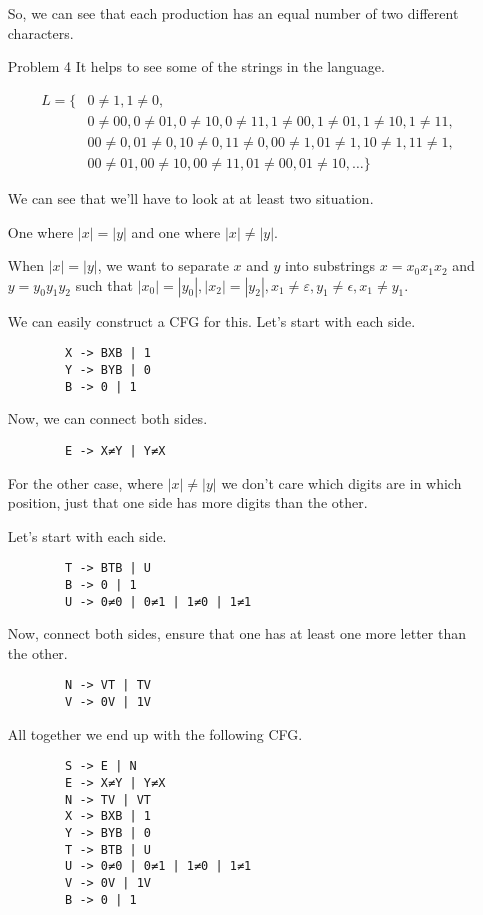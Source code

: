 \documentclass[12pt,letterpaper]{article}
\begin{document}
\begin{enumerate}
      So, we can see that each production has an equal number of two different characters.

    \item[Problem 4]
      It helps to see some of the strings in the language.

      \begin{align*}
        L = \{& 0\ne1, 1\ne0, \\
        & 0\ne00, 0\ne01, 0\ne10, 0\ne11, 1\ne00, 1\ne01, 1\ne10, 1\ne11, \\
        & 00\ne0, 01\ne0, 10\ne0, 11\ne0, 00\ne1, 01\ne1, 10\ne1, 11\ne1, \\
        & 00\ne01, 00\ne10, 00\ne11, 01\ne00, 01\ne10, \dots\}
      \end{align*}

      We can see that we'll have to look at at least two situation.

      One where $|x| = |y|$ and one where $|x| \ne |y|$.

      When $|x| = |y|$, we want to separate $x$ and $y$ into substrings $x = x_0x_1x_2$ and $y = y_0y_1y_2$ such that $|x_0| = |y_0|, |x_2| = |y_2|, x_1 \ne \varepsilon, y_1 \ne \epsilon, x_1 \ne y_1$.

      We can easily construct a CFG for this.
      Let's start with each side.

      \begin{lstlisting}
        X -> BXB | 1
        Y -> BYB | 0
        B -> 0 | 1
      \end{lstlisting}

      Now, we can connect both sides.

      \begin{lstlisting}
        E -> X≠Y | Y≠X
      \end{lstlisting}

      For the other case, where $|x| \ne |y|$ we don't care which digits are in which position, just that one side has more digits than the other.

      Let's start with each side.

      \begin{lstlisting}
        T -> BTB | U
        B -> 0 | 1
        U -> 0≠0 | 0≠1 | 1≠0 | 1≠1
      \end{lstlisting}

      Now, connect both sides, ensure that one has at least one more letter than the other.

      \begin{lstlisting}
        N -> VT | TV
        V -> 0V | 1V
      \end{lstlisting}

      All together we end up with the following CFG.

      \begin{lstlisting}
        S -> E | N
        E -> X≠Y | Y≠X
        N -> TV | VT
        X -> BXB | 1
        Y -> BYB | 0
        T -> BTB | U
        U -> 0≠0 | 0≠1 | 1≠0 | 1≠1
        V -> 0V | 1V
        B -> 0 | 1
      \end{lstlisting}

  \end{enumerate}
\end{document}

